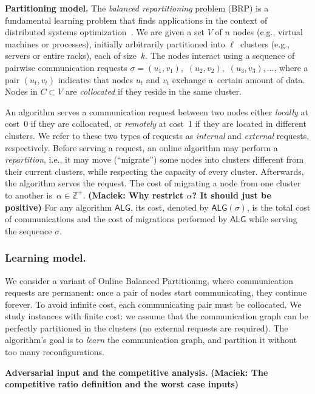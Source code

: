 \documentclass[manuscript,screen=true, review, anonymous]{acmart}
\newcommand{\ALG}{\textsf{ALG}\xspace}
\newcommand{\OBRP}{BRP}
\newcommand\maciek[1]{\color{brown}\textbf{(Maciek: #1)}\color{black}}
\begin{document}
\noindent
\textbf{Partitioning model.}
The \emph{balanced repartitioning} problem (\OBRP{})
is a fundamental learning problem
that finds applications in the context of
distributed systems optimization~\cite{repartition-disc}. We are given a set $V$ of $n$ nodes 
(e.g., virtual machines or processes),
initially arbitrarily partitioned into $\ell$~clusters
(e.g., servers or entire racks),
each of size~$k$.
The nodes interact using
a sequence of pairwise communication requests
$\sigma = (u_1,v_1),$ $(u_2,v_2),$ $(u_3,v_3), \ldots$,
where a pair $(u_t,v_t)$ indicates that nodes $u_t$ and $v_t$ exchange a~certain amount of data.
Nodes in $C \subset V$ are \emph{collocated}
if they reside in the same cluster.

An algorithm serves a communication request between two nodes
either \emph{locally} at cost~0
if they are collocated,
or \emph{remotely} at cost~1
if they are located in different clusters.
We refer to these two types of requests as \emph{internal}
and \emph{external} requests, respectively.
Before serving a request,
an online algorithm may perform a \emph{repartition},
i.e.,
it may move (``migrate'') some nodes into clusters different from their current clusters, while respecting the capacity of every cluster. 
Afterwards, 
the algorithm serves the  request.
The cost of migrating a node from one cluster to another
is~$\alpha \in \mathbb{Z}^+$.
\maciek{Why restrict $\alpha$? It should just be positive}
For any algorithm $\ALG$,
its cost,
denoted by $\ALG(\sigma)$,
is the total cost of communications and
the cost of migrations performed by $\ALG$ while serving the sequence $\sigma$.



\subsubsection{Learning model.}


We consider a variant of Online Balanced Partitioning, where communication requests are permanent: once a pair of nodes start communicating, they continue forever.
To avoid infinite cost, each communicating pair must be collocated.
We study instances with finite cost: we assume that the communication graph can be perfectly partitioned in the clusters (no external requests are required).
The algorithm's goal is to \emph{learn} the communication graph, and partition it without too many reconfigurations.

\noindent
\textbf{Adversarial input and the competitive analysis.}
\maciek{The competitive ratio definition and the worst case inputs}
\end{document}
